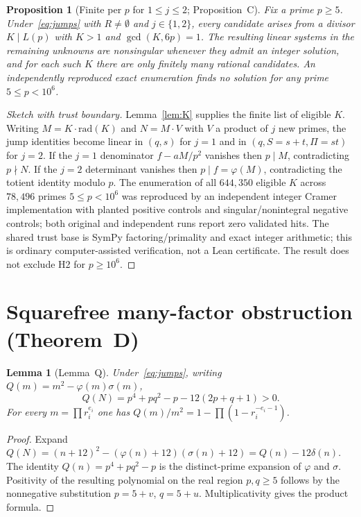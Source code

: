 \documentclass[11pt,reqno]{amsart}
\newcommand{\ph}{\varphi}
\newcommand{\sig}{\sigma}
\newtheorem{lemma}[theorem]{Lemma}
\newtheorem{proposition}[theorem]{Proposition}
\theoremstyle{definition}
\begin{document}
\begin{proposition}[Finite per \(p\) for \(1\le j\le 2\); Proposition~C]
\label{prop:C}
Fix a prime \(p\ge 5\). Under~\eqref{eq:jumps} with \(R\neq\emptyset\) and \(j\in\{1,2\}\), every candidate arises from a divisor \(K\mid L(p)\) with \(K>1\) and \(\gcd(K,6p)=1\). The resulting linear systems in the remaining unknowns are nonsingular whenever they admit an integer solution, and for each such \(K\) there are only finitely many rational candidates. An independently reproduced exact enumeration finds no solution for any prime \(5\le p<10^6\).
\end{proposition}

\begin{proof}[Sketch with trust boundary]
Lemma~\ref{lem:K} supplies the finite list of eligible \(K\). Writing \(M=K\cdot\mathrm{rad}(K)\) and \(N=M\cdot V\) with \(V\) a product of \(j\) new primes, the jump identities become linear in \((q,s)\) for \(j=1\) and in \((q,S=s+t,\Pi=st)\) for \(j=2\). If the \(j=1\) denominator \(f-aM/p^2\) vanishes then \(p\mid M\), contradicting \(p\nmid N\). If the \(j=2\) determinant vanishes then \(p\mid f=\ph(M)\), contradicting the totient identity modulo \(p\). The enumeration of all \(644{,}350\) eligible \(K\) across \(78{,}496\) primes \(5\le p<10^6\) was reproduced by an independent integer Cramer implementation with planted positive controls and singular/nonintegral negative controls; both original and independent runs report zero validated hits. The shared trust base is SymPy factoring/primality and exact integer arithmetic; this is ordinary computer-assisted verification, not a Lean certificate. The result does not exclude H2 for \(p\ge 10^6\).
\end{proof}

\section{Squarefree many-factor obstruction (Theorem~D)}
\label{sec:thmD}

\begin{lemma}[Lemma~Q]
\label{lem:Q}
Under~\eqref{eq:jumps}, writing \(Q(m)=m^2-\ph(m)\sig(m)\),
\[
Q(N)=p^4+pq^2-p-12(2p+q+1)>0.
\]
For every \(m=\prod r_i^{e_i}\) one has \(Q(m)/m^2=1-\prod(1-r_i^{-e_i-1})\).
\end{lemma}

\begin{proof}
Expand \(Q(N)=(n+12)^2-(\ph(n)+12)(\sig(n)+12)=Q(n)-12\delta(n)\). The identity \(Q(n)=p^4+pq^2-p\) is the distinct-prime expansion of \(\ph\) and \(\sig\). Positivity of the resulting polynomial on the real region \(p,q\ge 5\) follows by the nonnegative substitution \(p=5+v\), \(q=5+u\). Multiplicativity gives the product formula.
\end{proof}
\end{document}
